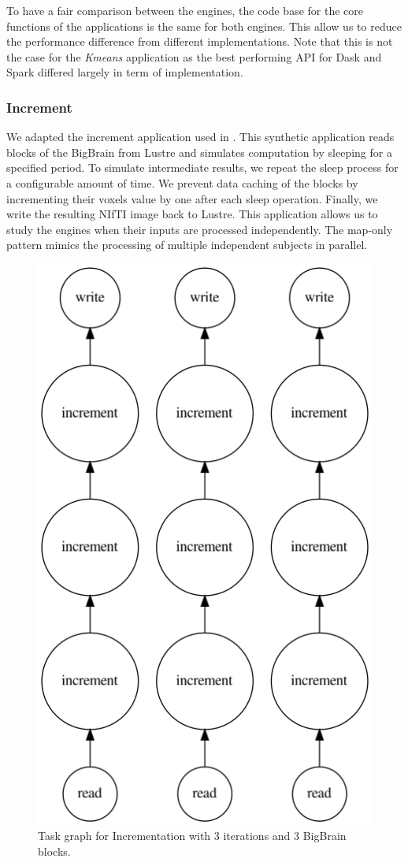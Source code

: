 \documentclass[conference]{IEEEtran}
\begin{document}
To have a fair comparison between the engines, the code base for the core functions of the applications is the same for both engines.
This allow us to reduce the performance difference from different implementations.
Note that this is not the case for the \textit{Kmeans} application as the best performing API for Dask and Spark differed largely in term of implementation.

\subsubsection{Increment}
We adapted the increment application used in \cite{hayot2019performance}.
This synthetic application reads blocks of the BigBrain from Lustre and
simulates computation by sleeping for a specified period. To simulate
intermediate results, we repeat the sleep process for a configurable amount
of time. We prevent data caching of the blocks by incrementing their voxels
value by one after each sleep operation. Finally, we write the resulting
NIfTI image back to Lustre. This application allows us to study the engines
when their inputs are processed independently. The map-only pattern
mimics the processing of multiple independent subjects in parallel.


\begin{figure}[!ht]
	\centering
	\includegraphics[height=\columnwidth,
	angle=0]{figures/increment.png}
	\caption{Task graph for Incrementation with 3 iterations and 3 BigBrain blocks.}
	\label{fig:graph-increment}
\end{figure}
\end{document}
